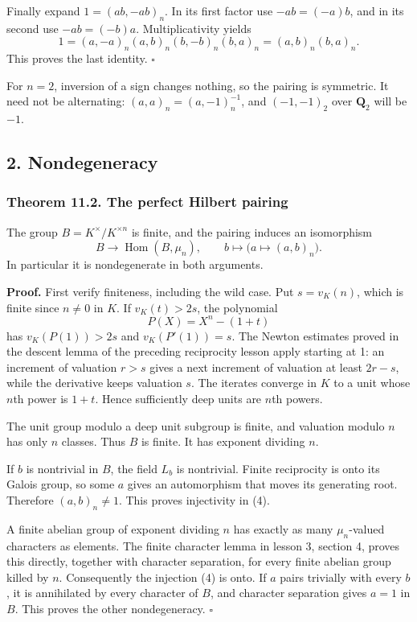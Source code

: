 \documentclass[11pt,a4paper]{article}
\begin{document}
Finally expand \(1=(ab,-ab)_n\). In its first factor use \(-ab=(-a)b\),
and in its second use \(-ab=(-b)a\). Multiplicativity yields \[
1=(a,-a)_n(a,b)_n(b,-b)_n(b,a)_n
  =(a,b)_n(b,a)_n.
\] This proves the last identity. \(\square\)

For \(n=2\), inversion of a sign changes nothing, so the pairing is
symmetric. It need not be alternating: \((a,a)_n=(a,-1)_n^{-1}\), and
\((-1,-1)_2\) over \(\mathbf Q_2\) will be \(-1\).

\subsection{2. Nondegeneracy}\label{nondegeneracy}

\subsubsection{Theorem 11.2. The perfect Hilbert
pairing}\label{theorem-11.2.-the-perfect-hilbert-pairing}

The group \(B=K^\times/K^{\times n}\) is finite, and the pairing induces
an isomorphism \[
B\longrightarrow\operatorname{Hom}(B,\mu_n),\qquad
b\longmapsto\bigl(a\mapsto(a,b)_n\bigr).
\tag{4}
\] In particular it is nondegenerate in both arguments.

\textbf{Proof.} First verify finiteness, including the wild case. Put
\(s=v_K(n)\), which is finite since \(n\ne0\) in \(K\). If
\(v_K(t)>2s\), the polynomial \[
P(X)=X^n-(1+t)
\] has \(v_K(P(1))>2s\) and \(v_K(P'(1))=s\). The Newton estimates
proved in the descent lemma of the preceding reciprocity lesson apply
starting at 1: an increment of valuation \(r>s\) gives a next increment
of valuation at least \(2r-s\), while the derivative keeps valuation
\(s\). The iterates converge in \(K\) to a unit whose \(n\)th power is
\(1+t\). Hence sufficiently deep units are \(n\)th powers.

The unit group modulo a deep unit subgroup is finite, and valuation
modulo \(n\) has only \(n\) classes. Thus \(B\) is finite. It has
exponent dividing \(n\).

If \(b\) is nontrivial in \(B\), the field \(L_b\) is nontrivial. Finite
reciprocity is onto its Galois group, so some \(a\) gives an
automorphism that moves its generating root. Therefore \((a,b)_n\ne1\).
This proves injectivity in (4).

A finite abelian group of exponent dividing \(n\) has exactly as many
\(\mu_n\)-valued characters as elements. The finite character lemma in
lesson 3, section 4, proves this directly, together with character
separation, for every finite abelian group killed by \(n\). Consequently
the injection (4) is onto. If \(a\) pairs trivially with every \(b\), it
is annihilated by every character of \(B\), and character separation
gives \(a=1\) in \(B\). This proves the other nondegeneracy. \(\square\)
\end{document}
